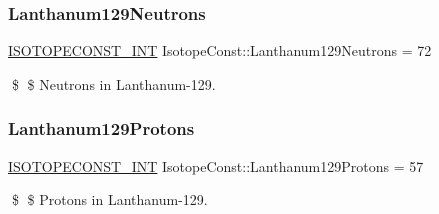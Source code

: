 \subsubsection{\texorpdfstring{Lanthanum129\+Neutrons}{Lanthanum129Neutrons}}
{\footnotesize\ttfamily \mbox{\hyperlink{group___isotope_const-_macros_ga5f18360b3e99483a35c32d789e62621c}{I\+S\+O\+T\+O\+P\+E\+C\+O\+N\+S\+T\+\_\+\+I\+NT}} Isotope\+Const\+::\+Lanthanum129\+Neutrons = 72}

\$ \$ Neutrons in Lanthanum-\/129. \mbox{\label{group___isotope_const-_lanthanum-_la129_gab57fdf3688b9245f1ca385e5a9bf376b}} 
\subsubsection{\texorpdfstring{Lanthanum129\+Protons}{Lanthanum129Protons}}
{\footnotesize\ttfamily \mbox{\hyperlink{group___isotope_const-_macros_ga5f18360b3e99483a35c32d789e62621c}{I\+S\+O\+T\+O\+P\+E\+C\+O\+N\+S\+T\+\_\+\+I\+NT}} Isotope\+Const\+::\+Lanthanum129\+Protons = 57}

\$ \$ Protons in Lanthanum-\/129. 